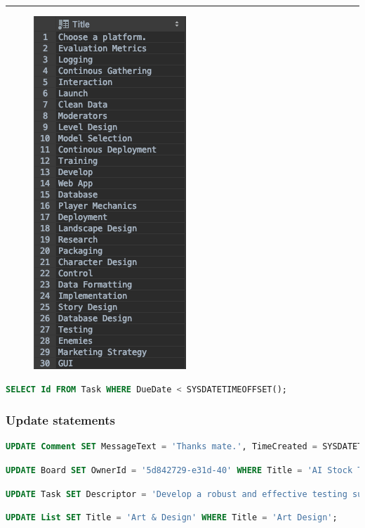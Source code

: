 \documentclass[letterpaper]{article}
\begin{document}
\hrule
\begin{figure}[H]
\centering
\includegraphics[scale=0.5]{Images/OverdueTasks}
\end{figure}
\begin{lstlisting}[language=SQL, caption=Select All Overdue Tasks]
SELECT Id FROM Task WHERE DueDate < SYSDATETIMEOFFSET();
\end{lstlisting}

\subsubsection{Update statements}

\begin{lstlisting}[language=SQL, caption=Edit Comment Text]
UPDATE Comment SET MessageText = 'Thanks mate.', TimeCreated = SYSDATETIMEOFFSET() WHERE Id = '49570bdb-0702-45';
\end{lstlisting}
\begin{lstlisting}[language=SQL, caption=Change Board Owner]
UPDATE Board SET OwnerId = '5d842729-e31d-40' WHERE Title = 'AI Stock Trader';
\end{lstlisting}
\begin{lstlisting}[language=SQL, caption=Change Task Description]
UPDATE Task SET Descriptor = 'Develop a robust and effective testing suite.' WHERE Title = 'Testing';
\end{lstlisting}
\begin{lstlisting}[language=SQL, caption=Rename a List]
UPDATE List SET Title = 'Art & Design' WHERE Title = 'Art Design';
\end{lstlisting}
\end{document}
